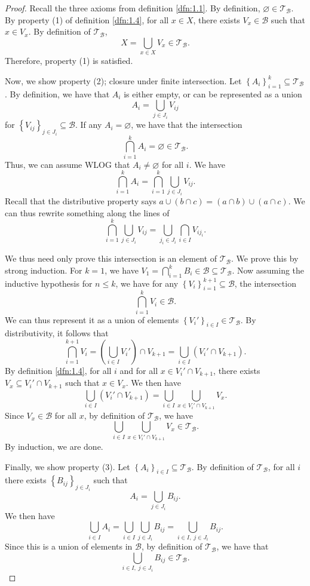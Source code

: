 \begin{proof}
	Recall the three axioms from definition \ref{dfn:1.1}. By definition, $\varnothing\in \mathcal{T}_\mathcal{B} $. By property (1) of definition \ref{dfn:1.4}, for all $x\in X$, there exists $V_x\in \mathcal{B} $ such that $x\in V_x$. By definition of $\mathcal{T} _\mathcal{B} $,
	\[
		X = \bigcup_{x\in X} V_x \in \mathcal{T}_{\mathcal{B} } 
	.\]
	Therefore, property (1) is satisfied.

	Now, we show property (2); closure under finite intersection. Let $\left\{ A_i \right\}_{i=1}^k \subseteq \mathcal{T} _{\mathcal{B} }$. By definition, we have that $A_i$ is either empty, or can be represented as a union
	\[
		A_i = \bigcup_{j\in J_i} V_{ij}
	\]
	for $\left\{ V_{ij} \right\}_{j\in J_i} \subseteq \mathcal{B} $. If any $A_i=\varnothing$, we have that the intersection
	\[
		\bigcap_{i=1}^{k} A_i=\varnothing\in \mathcal{T} _{\mathcal{B} }
	.\]
	Thus, we can assume WLOG that $A_i \neq \varnothing$ for all $i$. We have
	\[
		\bigcap_{i=1}^{k} A_i = \bigcap_{i=1}^{k} \bigcup_{j\in J_i} V_{ij}
	.\]
	Recall that the distributive property says $a \cup (b\cap c)=(a\cap b)\cup (a\cap c)$. We can thus rewrite something along the lines of
	\[
		\bigcap_{i=1}^{k} \bigcup_{j\in J_i} V_{ij}=\bigcup_{j_i\in J_i}\bigcap_{i\in I} V_{ij_i}
	.\]

	We thus need only prove this intersection is an element of $\mathcal{T}_{\mathcal{B} }$. We prove this by strong induction. For $k=1$, we have $V_1=\bigcap_{i=1}^{k} B_i\in \mathcal{B} \subseteq \mathcal{T} _{\mathcal{B} }$. Now assuming the inductive hypothesis for $n\leq k$, we have for any $\left\{ V_i \right\}_{i=1}^{k+1}\subseteq  \mathcal{B} $, the intersection
	\[
		\bigcap_{i=1}^{k} V_i \in \mathcal{B} 
	.\]
	We can thus represent it as a union of elements $\left\{ V_i' \right\}_{i\in I} \in \mathcal{T} _{\mathcal{B} }$. By distributivity, it follows that
	\[
		\bigcap_{i=1}^{k+1} V_{i}=\left( \bigcup_{i\in I} V_i'  \right) \cap V_{k+1}=\bigcup_{i\in I} \left( V_i' \cap V_{k+1} \right)  
	.\]
	By definition \ref{dfn:1.4}, for all $i$ and for all $x\in V_i'\cap V_{k+1}$, there exists $V_x \subseteq V_i'\cap V_{k+1}$ such that $x\in V_x$. We then have
	\[
		\bigcup_{i\in I}\left( V_i' \cap V_{k+1} \right) =\bigcup_{i\in I} \bigcup_{x\in V_i'\cap V_{k+1}} V_x 
	.\]
	Since $V_x\in \mathcal{B} $ for all $x$, by definition of $\mathcal{T} _{\mathcal{B} }$, we have
	\[
		\bigcup_{i\in I} \bigcup_{x\in V_i'\cap V_{k+1}} V_x \in \mathcal{T} _{\mathcal{B} }
	.\]
	By induction, we are done.

	Finally, we show property (3). Let $\left\{ A_i \right\}_{i\in I}\subseteq \mathcal{T} _\mathcal{B} $. By definition of $\mathcal{T}_{\mathcal{B} }$, for all $i$ there exists $\left\{ B_{ij} \right\}_{j\in J_i}$ such that
	\[
		A_i = \bigcup_{j\in J_i} B_{ij} 
	.\]
	We then have
	\[
		\bigcup_{i\in I} A_i = \bigcup_{i\in I}\bigcup_{j\in J_i} B_{ij}=\bigcup_{i\in I,\; j\in J_i} B_{ij}
	.\]
	Since this is a union of elements in $\mathcal{B} $, by definition of $\mathcal{T}_{\mathcal{B} } $, we have that
	\[
		\bigcup_{i\in I,\; j\in J_i} B_{ij}\in \mathcal{T} _{\mathcal{B} }
	.\]
\end{proof}
